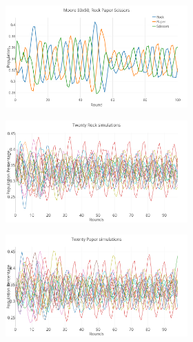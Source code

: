 \documentclass[a4paper, 11pt]{article}
\begin{document}
\newpage
\begin{figure}[H]
\begin{subfigure}{.65\textwidth}
	\begin{subfigure}{1\textwidth}
		\includegraphics[width=1\linewidth]{50x50_33RockDist_IndividualGame}
	\end{subfigure}

	\begin{subfigure}{1\textwidth}
		\includegraphics[width=1\linewidth]{50x50_33RockDist_Rock}
	\end{subfigure}
	
	\begin{subfigure}{1\textwidth}
		\includegraphics[width=1\linewidth]{50x50_33RockDist_Paper}
	\end{subfigure}	
	

\end{subfigure}
\end{figure}
\end{document}
